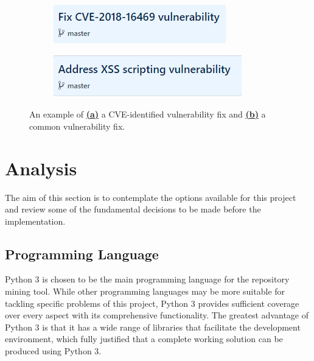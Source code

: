 \documentclass[12pt, a4paper]{report}
\begin{document}
\begin{figure}[H]
  \centering
  \begin{subfigure}{.5\textwidth}
    \centering
    \includegraphics[width=.85\linewidth]{images/cve_vuln.png}
  \end{subfigure}%
  \begin{subfigure}{.5\textwidth}
    \centering
    \includegraphics[width=.85\linewidth]{images/common_vuln.png}
  \end{subfigure}
  \caption[Comparison of a CVE-identified and common vulnerability-fixing commit]%
  {An example of \hyperref[figure:cve_vuln]{\textbf{(a)}} a CVE-identified vulnerability fix and
  \hyperref[figure:common_vuln]{\textbf{(b)}} a common vulnerability fix.}
  \label{figure:fig_scope}
\end{figure}

\section{Analysis}
The aim of this section is to contemplate the options available for this project and review some of
the fundamental decisions to be made before the implementation.

\subsection{Programming Language}
Python 3 \cite{python} is chosen to be the main programming language for the repository mining tool.
While other programming languages may be more suitable for tackling specific problems of this
project, Python 3 provides sufficient coverage over every aspect with its comprehensive
functionality. The greatest advantage of Python 3 is that it has a wide range of libraries that
facilitate the development environment, which fully justified that a complete working solution can
be produced using Python 3.
\end{document}

